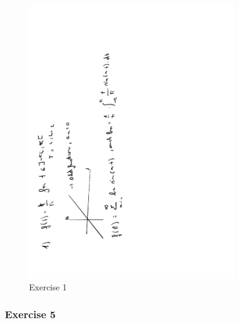 \documentclass[a4paper]{report}
\begin{document}
\begin{figure}[H]
	\centering
	\includegraphics[angle=-90, width=0.8\textwidth]{assets/bord_9_ex_1.pdf}
	\caption{Exercise 1}
\end{figure}



\subsubsection{Exercise 5}
\end{document}
